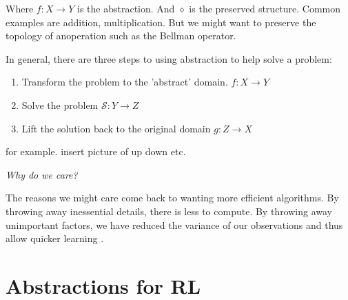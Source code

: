 Where $f: X\to Y$ is the abstraction. And $\diamond$ is the preserved structure.
Common examples are addition, multiplication. But we might want to preserve the topology of anoperation such as the Bellman operator.

In general, there are three steps to using abstraction to help solve a problem:

\begin{enumerate}
\tightlist
  \item Transform the problem to the 'abstract' domain. $f: X\to Y$
  \item Solve the problem $\mathcal S: Y \to Z$
  \item Lift the solution back to the original domain  $g:Z \to X$
\end{enumerate}

for example.
insert picture of up down etc.

\begin{displayquote}
 \textit{Why do we care?}
\end{displayquote}

The reasons we might care come back to wanting more efficient algorithms.
By throwing away inessential details, there is less to compute.
By throwing away unimportant factors, we have reduced the variance of our
observations and thus allow quicker learning \cite{Allen-Zhu2016a,Johnson2013a}.


%


\section{Abstractions for RL}


